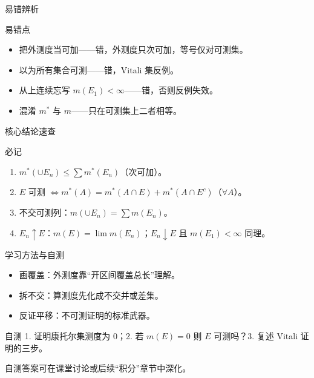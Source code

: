 \documentclass[aspectratio=169,11pt]{ctexbeamer}
\begin{document}
\begin{frame}{易错辨析}
  \begin{block}{易错点}
    \begin{itemize}
      \item 把外测度当可加——错，外测度只次可加，等号仅对可测集。
      \item 以为所有集合可测——错，Vitali 集反例。
      \item 从上连续忘写 $m(E_1)<\infty$——错，否则反例失效。
      \item 混淆 $m^{*}$ 与 $m$——只在可测集上二者相等。
    \end{itemize}
  \end{block}
\end{frame}

\begin{frame}{核心结论速查}
  \begin{block}{必记}
    \begin{enumerate}
      \item $m^{*}(\cup E_n)\le\sum m^{*}(E_n)$（次可加）。
      \item $E$ 可测 $\Leftrightarrow m^{*}(A)=m^{*}(A\cap E)+m^{*}(A\cap E^{c})$（$\forall A$）。
      \item 不交可测列：$m(\cup E_n)=\sum m(E_n)$。
      \item $E_n\uparrow E$：$m(E)=\lim m(E_n)$；$E_n\downarrow E$ 且 $m(E_1)<\infty$ 同理。
    \end{enumerate}
  \end{block}
\end{frame}

\begin{frame}{学习方法与自测}
  \begin{itemize}
    \item \alert{画覆盖}：外测度靠“开区间覆盖总长”理解。
    \item \alert{拆不交}：算测度先化成不交并或差集。
    \item \alert{反证平移}：不可测证明的标准武器。
  \end{itemize}
  \begin{block}{自测}
    1. 证明康托尔集测度为 0；2. 若 $m(E)=0$ 则 $E$ 可测吗？3. 复述 Vitali 证明的三步。
  \end{block}
  \begin{center}
    \color{cloudgray}\small 自测答案可在课堂讨论或后续“积分”章节中深化。
  \end{center}
\end{frame}
\end{document}
